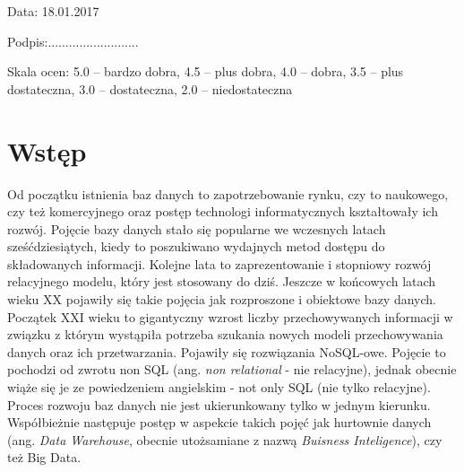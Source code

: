 \documentclass[a4paper,12pt,table]{article}
\begin{document}


\vspace*{0.15cm}
\begin{minipage}{0.5\textwidth}
\begin{center}
Data: 18.01.2017
\end{center}

\end{minipage}
\begin{minipage}{0.5\textwidth}
\begin{center}
Podpis:{\large ..........................}
\end{center}

\end{minipage}\newline

\vspace*{0.35cm}
 
 
{\scriptsize Skala ocen: 5.0 – bardzo dobra, 4.5 – plus dobra, 4.0 – dobra, 3.5 – plus dostateczna, 3.0 – dostateczna, 2.0 – niedostateczna}
\parindent=0pt
\newpage
\tableofcontents
\newpage
\section{Wstęp}
\setlength{\parskip}{2\bigskipamount plus \smallskipamount minus \smallskipamount}


\indent Od początku istnienia baz danych to zapotrzebowanie rynku, czy to naukowego, czy też komercyjnego oraz postęp technologi informatycznych kształtowały ich rozwój. Pojęcie bazy danych stało się popularne we wczesnych latach sześćdziesiątych, kiedy to poszukiwano wydajnych metod dostępu do składowanych informacji. Kolejne lata to zaprezentowanie i stopniowy rozwój relacyjnego modelu, który jest stosowany do dziś. Jeszcze w końcowych latach wieku XX pojawiły się takie pojęcia jak rozproszone i obiektowe bazy danych. Początek XXI wieku to gigantyczny wzrost liczby przechowywanych informacji w związku z którym wystąpiła potrzeba szukania nowych modeli przechowywania danych oraz ich przetwarzania. Pojawiły się rozwiązania NoSQL-owe. Pojęcie to pochodzi od zwrotu non SQL (ang.\textit{ non relational }- nie relacyjne), jednak obecnie wiąże się je ze powiedzeniem angielskim - not only SQL (nie tylko relacyjne). Proces rozwoju baz danych nie jest ukierunkowany tylko w jednym kierunku. Współbieżnie następuje postęp w aspekcie takich pojęć jak hurtownie danych (ang.\textit{ Data Warehouse}, obecnie utożsamiane z nazwą \textit{Buisness Inteligence}), czy też Big Data.
\end{document}
